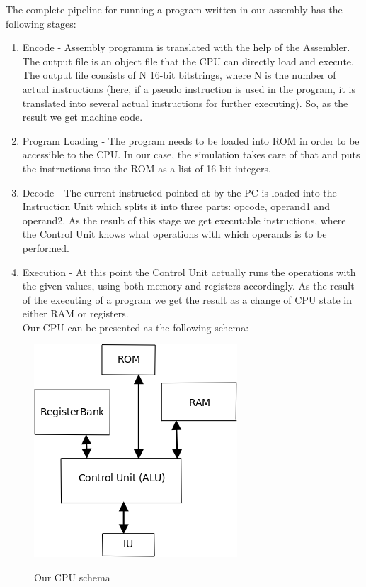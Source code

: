\documentclass[12pt,a4paper]{scrartcl}
\begin{document}
The complete pipeline for running a program written in our assembly has the following stages:
\begin{enumerate}
	\item Encode - Assembly programm is translated with the help of the Assembler. The output file is an object file that the CPU can directly load and execute. The output file consists of N 16-bit bitstrings, where N is the number of actual instructions (here, if a pseudo instruction is used in the program, it is translated into several actual instructions for further executing). So, as the result we get machine code.
	\item Program Loading - The program needs to be loaded into ROM in order to be accessible to the CPU. In our case, the simulation takes care of that and puts the instructions into the ROM as a list of 16-bit integers.
	\item Decode - The current instructed pointed at by the PC is loaded into the Instruction Unit which splits it into three parts: opcode, operand1 and operand2. As the result of this stage we get executable instructions, where the Control Unit knows what operations with which operands is to be performed. 
	\item Execution - At this point the Control Unit actually runs the operations with the given values, using both memory and registers accordingly. As the result of the executing of a program we get the result as a change of CPU state in either RAM or registers.\\
	
Our CPU can be presented as the following schema:
\end{enumerate} 

\begin{figure}[h]
	\centering
	\includegraphics[scale=0.6]{pics/ourCPU.png}\\
	\caption{Our CPU schema}
\end{figure}
\end{document}
